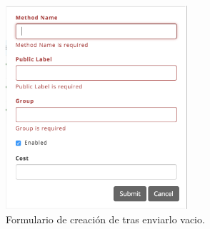 \begin{figure}[H]
	\centering
	\includegraphics[width=0.6\textwidth]{figuras/dashboard/shipping/form_shipping_add_send_empty.png}
	\caption{Formulario de creación de \shippingEF tras enviarlo vacio.}
	\label{figure:apendice:dashboard:shipping:form_shipping_add_send_empty}
\end{figure}